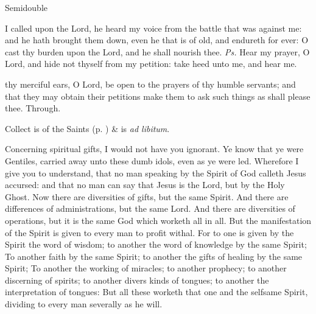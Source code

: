 \begin{inhead}
{Semidouble}
\end{inhead}

\properantiphonfix

\introit
{} I called upon the Lord, he heard my voice from the battle that was against me: and he hath brought them down, even he that is of old, and endureth for ever: O cast thy burden upon the Lord, and he shall nourish thee. \textit{Ps.} Hear my prayer, O Lord, and hide not thyself from my petition: take heed unto me, and hear me.

\collect
{} thy merciful ears, O Lord, be open to the prayers of thy humble servants; and that they may obtain their petitions make them to ask such things as shall please thee. Through.
\begin{rubric}
     Collect is of the Saints (p. \pageref{SPSaints}) \&  is \emph{ad libitum}.
\end{rubric}

 Concerning spiritual gifts, I would not have you ignorant. Ye know that ye were Gentiles, carried away unto these dumb idols, even as ye were led. Wherefore I give you to understand, that no man speaking by the Spirit of God calleth Jesus accursed: and that no man can say that Jesus is the Lord, but by the Holy Ghost. Now there are diversities of gifts, but the same Spirit. And there are differences of administrations, but the same Lord. And there are diversities of operations, but it is the same God which worketh all in all. But the manifestation of the Spirit is given to every man to profit withal. For to one is given by the Spirit the word of wisdom; to another the word of knowledge by the same Spirit; To another faith by the same Spirit; to another the gifts of healing by the same Spirit; To another the working of miracles; to another prophecy; to another discerning of spirits; to another divers kinds of tongues; to another the interpretation of tongues: But all these worketh that one and the selfsame Spirit, dividing to every man severally as he will.


